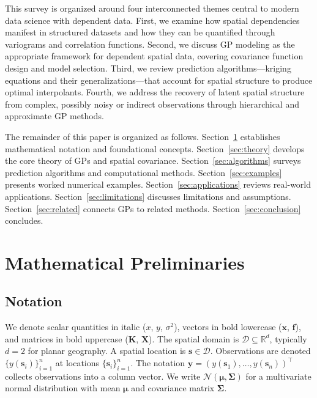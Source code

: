 \documentclass[conference]{IEEEtran}
\begin{document}
This survey is organized around four interconnected themes central to modern data science with dependent data. First, we examine how spatial dependencies manifest in structured datasets and how they can be quantified through variograms and correlation functions. Second, we discuss GP modeling as the appropriate framework for dependent spatial data, covering covariance function design and model selection. Third, we review prediction algorithms---kriging equations and their generalizations---that account for spatial structure to produce optimal interpolants. Fourth, we address the recovery of latent spatial structure from complex, possibly noisy or indirect observations through hierarchical and approximate GP methods.

The remainder of this paper is organized as follows. Section~\ref{sec:prelim} establishes mathematical notation and foundational concepts. Section~\ref{sec:theory} develops the core theory of GPs and spatial covariance. Section~\ref{sec:algorithms} surveys prediction algorithms and computational methods. Section~\ref{sec:examples} presents worked numerical examples. Section~\ref{sec:applications} reviews real-world applications. Section~\ref{sec:limitations} discusses limitations and assumptions. Section~\ref{sec:related} connects GPs to related methods. Section~\ref{sec:conclusion} concludes.

\section{Mathematical Preliminaries}
\label{sec:prelim}

\subsection{Notation}

We denote scalar quantities in italic ($x$, $y$, $\sigma^2$), vectors in bold lowercase ($\mathbf{x}$, $\mathbf{f}$), and matrices in bold uppercase ($\mathbf{K}$, $\mathbf{X}$). The spatial domain is $\mathcal{D} \subseteq \mathbb{R}^d$, typically $d = 2$ for planar geography. A spatial location is $\mathbf{s} \in \mathcal{D}$. Observations are denoted $\{y(\mathbf{s}_i)\}_{i=1}^n$ at locations $\{\mathbf{s}_i\}_{i=1}^n$. The notation $\mathbf{y} = (y(\mathbf{s}_1), \ldots, y(\mathbf{s}_n))^\top$ collects observations into a column vector. We write $\mathcal{N}(\bm{\mu}, \bm{\Sigma})$ for a multivariate normal distribution with mean $\bm{\mu}$ and covariance matrix $\bm{\Sigma}$.
\end{document}
